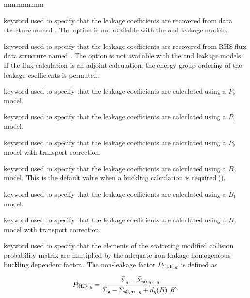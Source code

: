 \begin{ListeDeDescription}{mmmmmmm}

\item[\moc{LKRD}] keyword used to specify that the leakage coefficients are
recovered from data structure named . The  option is not
available with the  and  leakage models.

\item[\moc{RHS}] keyword used to specify that the leakage coefficients are
recovered from RHS flux data structure named . The  option is not
available with the  and  leakage models. If the flux calculation is
an adjoint calculation, the energy group ordering of the leakage coefficients is permuted.

\item[\moc{P0}] keyword used to specify that the leakage coefficients are
calculated using a $P_0$ model.

\item[\moc{P1}] keyword used to specify that the leakage coefficients are
calculated using a $P_1$ model. 

\item[\moc{P0TR}] keyword used to specify that the leakage coefficients are
calculated using a $P_0$ model with transport correction.

\item[\moc{B0}] keyword used to specify that the leakage coefficients are
calculated using a $B_0$ model. This is the default value when a buckling
calculation is required ().

\item[\moc{B1}] keyword used to specify that the leakage coefficients are
calculated using a $B_1$ model.

\item[\moc{B0TR}] keyword used to specify that the leakage coefficients are
calculated using a $B_0$ model with transport correction.

\item[\moc{PNLR}] keyword used to specify that the elements of the scattering
modified collision probability matrix
are multiplied by the adequate non-leakage homogeneous buckling dependent
factor.\cite{ALSB1}. The non-leakage
factor $P_{{\rm NLR},g}$ is defined as

\begin{equation}
P_{{\rm NLR},g}={\bar\Sigma_g-\bar\Sigma_{{\rm s0},g \gets g}\over{\bar\Sigma_g-\bar\Sigma_{{\rm s0},g \gets g}+d_g(B) \ B^2}}
\end{equation}


\end{ListeDeDescription}
